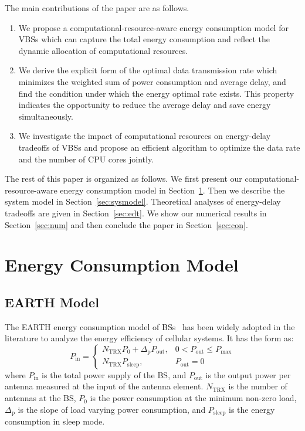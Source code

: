 \documentclass[conference]{IEEEtran}
\begin{document}
The main contributions of the paper are as follows.
\begin{enumerate}
  \item We propose a computational-resource-aware energy consumption model for
    VBSs which can capture the total energy consumption and
    reflect the dynamic allocation of computational resources.

  \item We derive the explicit form of the optimal data transmission rate
    which minimizes the weighted sum of power consumption and average delay,
    and find the condition under which the energy optimal rate exists. This
    property
    indicates the opportunity to reduce the average delay and save energy
    simultaneously.

  \item We investigate the impact of computational resources on energy-delay
    tradeoffs of VBSs and propose an efficient algorithm to optimize the data
    rate and the number of CPU cores jointly.

\end{enumerate}

The rest of this paper is organized as follows. We first present our
computational-resource-aware energy consumption model in
Section~\ref{sec:model}. Then we
describe the system model in Section~\ref{sec:sysmodel}.  Theoretical analyses
of energy-delay tradeoffs are given in Section~\ref{sec:edt}.  We show our
numerical results in Section~\ref{sec:num} and then conclude the paper in
Section~\ref{sec:con}.

\section{Energy Consumption Model}
\label{sec:model}
\subsection{EARTH Model}
The EARTH energy consumption model of BSs~\cite{auer2011howmuch}
has been widely adopted in
the literature to analyze the energy efficiency of cellular systems.
It has the form as:
\begin{equation}
  P_\text{in} = \begin{cases}
    N_{\text{TRX}} P_0 + \Delta_\text{p} P_\text{out}, & 0 < P_\text{out} \le P_\text{max} \\
    N_{\text{TRX}} P_\text{sleep}, & P_\text{out} = 0
  \end{cases}
  \label{eqn:earth}
\end{equation}
where $P_\text{in}$ is the total power supply of the BS,
and $P_\text{out}$ is the output power per antenna measured at the input of the
antenna element.
$N_{\text{TRX}}$ is the number of antennas at the BS,
$P_0$ is the power consumption at the minimum non-zero load,
$\Delta_\text{p}$ is the slope of load varying power consumption,
and $P_\text{sleep}$ is the energy consumption in sleep mode.
\end{document}
